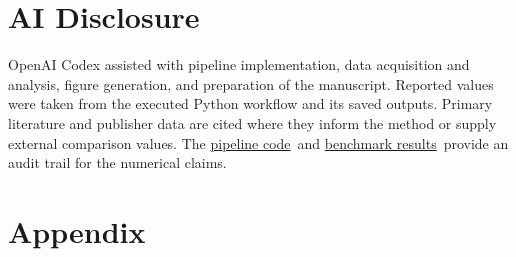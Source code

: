 \documentclass[10pt,a4paper,twocolumn]{article}
\newcommand{\RepoURL}{https://github.com/parsabe/Beyond-Normal-Weather}
\newcommand{\RepoPipeline}{\href{\RepoURL/tree/hydrogen-pipeline}{pipeline code}}
\newcommand{\RepoBenchmarks}{\href{\RepoURL/tree/hydrogen-benchmarks/reports}{benchmark results}}
\begin{document}
\section{AI Disclosure}
OpenAI Codex assisted with pipeline implementation, data acquisition and analysis, figure generation, and preparation of the manuscript. Reported values were taken from the executed Python workflow and its saved outputs. Primary literature and publisher data are cited where they inform the method or supply external comparison values. The \RepoPipeline\ and \RepoBenchmarks\ provide an audit trail for the numerical claims.

\onecolumn


\clearpage
\appendix
{}
\section*{Appendix}

\end{document}
